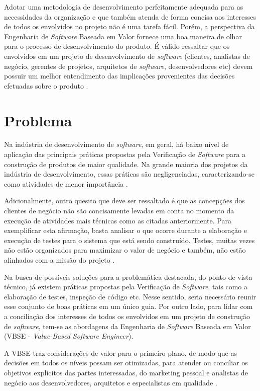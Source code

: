 Adotar uma metodologia de desenvolvimento perfeitamente adequada para as necessidades da organização e que também atenda de forma concisa aos interesses de todos os envolvidos no projeto não é uma tarefa fácil. Porém, a perspectiva da Engenharia de \textit{Software} Baseada em Valor fornece uma boa maneira de olhar para o processo de desenvolvimento do produto. É válido ressaltar que os envolvidos em um projeto de desenvolvimento de \textit{software} (clientes, analistas de negócio, gerentes de projetos, arquitetos de \textit{software}, desenvolvedores etc) devem possuir um melhor entendimento das implicações provenientes das decisões efetuadas sobre o produto \cite{vbse1}.

\section{Problema}

Na indústria de desenvolvimento de \textit{software}, em geral, há baixo nível de aplicação das principais práticas propostas pela Verificação de \textit{Software} para a construção de produtos de maior qualidade. Na grande maioria dos projetos da indústria de desenvolvimento, essas práticas são negligenciadas, caracterizando-se como atividades de menor importância \cite{cemkaner}.

Adicionalmente, outro quesito que deve ser ressaltado é que as concepções dos clientes de negócio não são concisamente levadas em conta no momento da execução de atividades mais técnicas como as citadas anteriormente. Para exemplificar esta afirmação, basta analisar o que ocorre durante a elaboração e execução de testes para o sistema que está sendo construído. Testes, muitas vezes não estão organizados para maximizar o valor de negócio e também, não estão alinhados com a missão do projeto \cite{vbse2}.

Na busca de possíveis soluções para a problemática destacada, do ponto de vista técnico, já existem práticas propostas pela Verificação de \textit{Software}, tais como a elaboração de testes, inspeção de código etc. Nesse sentido, seria necessário reunir esse conjunto de boas práticas em um único guia. Por outro lado, para lidar com a conciliação dos interesses de todos os envolvidos em um projeto de construção de \textit{software}, tem-se as abordagens da Engenharia de \textit{Software} Baseada em Valor (VBSE - \textit{Value-Based Software Engineer}).

A VBSE traz considerações de valor para o primeiro plano, de modo que as decisões em todos os níveis possam ser otimizadas, para atender ou conciliar os objetivos explícitos das partes interessadas, do marketing pessoal e analistas de negócio aos desenvolvedores, arquitetos e especialistas em qualidade \cite{vbse1}.

